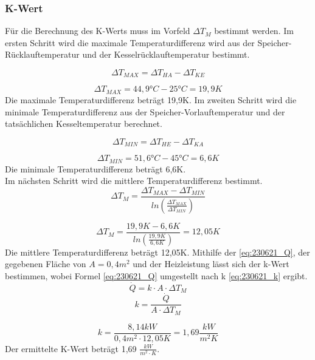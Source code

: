 \subsubsection*{K-Wert}
Für die Berechnung des K-Werts muss im Vorfeld $\Delta T_M$ bestimmt werden.
Im ersten Schritt wird die maximale Temperaturdifferenz wird aus der Speicher-Rücklauftemperatur und der Kesselrücklauftemperatur bestimmt.

\begin{equation}
    \Delta T_{MAX}= \Delta T_{HA}-\Delta T_{KE}
    \label{eq:230621_DeltaTMAX}
\end{equation}

$$\Delta T_{MAX}= 44,9\text{°}C-25 \text{°} C= 19,9K$$
Die maximale Temperaturdifferenz beträgt 19,9K.
Im zweiten Schritt wird die minimale Temperaturdifferenz aus der Speicher-Vorlauftemperatur und der tatsächlichen Kesseltemperatur berechnet.

\begin{equation}
    \Delta T_{MIN}= \Delta T_{HE}-\Delta T_{KA}
    \label{eq:230621_DeltaTMIN}
\end{equation}

$$\Delta T_{MIN}= 51,6 \text{°} C-45 \text{°} C= 6,6K$$
Die minimale Temperaturdifferenz beträgt 6,6K.\\
Im nächsten Schritt wird die mittlere Temperaturdifferenz bestimmt.
\begin{equation}
    \Delta T_{M}= \frac{\Delta T_{MAX}-\Delta T_{MIN}}{ln(\frac{\Delta T_{MAX}}{\Delta T_{MIN}})}
    \label{eq:230621_DeltaTM}
\end{equation}

$$\Delta T_M= \frac{19,9K-6,6K}{ln(\frac{19,9K}{6,6K})}= 12,05K$$
Die mittlere Temperaturdifferenz beträgt 12,05K.
\newpage
Mithilfe der \autoref{eq:230621_Q}, der gegebenen Fläche von $A= 0,4m^2$ und der Heizleistung lässt sich der k-Wert bestimmen, wobei Formel \ref*{eq:230621_Q} umgestellt nach k \autoref{eq:230621_k} ergibt.
\begin{equation}
    \dot{Q}=k\cdot A \cdot \Delta T_M
    \label{eq:230621_Q}
\end{equation}
\begin{equation}
    k = \frac{\dot{Q}}{ A \cdot \Delta T_M} 
    \label{eq:230621_k}
\end{equation}

$$k=\frac{8,14 kW}{ 0,4m^2 \cdot 12,05K}=1,69 \frac{kW}{m^2K}$$
Der ermittelte K-Wert beträgt 1,69 $\frac{kW}{m^2\cdot K}$.
